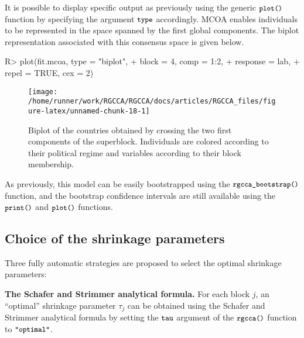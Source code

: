 \documentclass[
]{jss}
\begin{document}
\normalsize

It is possible to display specific output as previously using the
generic \(\small{\texttt{plot()}}\) function by specifying the argument
\(\small{\texttt{type}}\) accordingly. MCOA enables individuals to be
represented in the space spanned by the first global components. The
biplot representation associated with this consensus space is given
below.

\footnotesize

\begin{CodeChunk}
\begin{CodeInput}
R> plot(fit.mcoa, type = "biplot", 
+      block = 4, comp = 1:2, 
+      response = lab, 
+      repel = TRUE, cex = 2)
\end{CodeInput}
\begin{figure}[H]

{\centering \texttt{[image: /home/runner/work/RGCCA/RGCCA/docs/articles/RGCCA\_files/figure-latex/unnamed-chunk-18-1]} 

}

\caption[Biplot of the countries obtained by crossing the two first components of the superblock]{Biplot of the countries obtained by crossing the two first components of the superblock. Individuals are colored according to their political regime and variables according to their block membership.}\label{fig:unnamed-chunk-18}
\end{figure}
\end{CodeChunk}

\normalsize

As previously, this model can be easily bootstrapped using the
\(\small{\texttt{rgcca\_bootstrap()}}\) function, and the bootstrap
confidence intervals are still available using the
\(\small{\texttt{print()}}\) and \(\small{\texttt{plot()}}\) functions.

\hypertarget{choice-of-the-shrinkage-parameters}{%
\subsection{Choice of the shrinkage
parameters}\label{choice-of-the-shrinkage-parameters}}

Three fully automatic strategies are proposed to select the optimal
shrinkage parameters:

\textbf{The Schafer and Strimmer analytical formula.} For each block
\(j\), an ``optimal'' shrinkage parameter \(\tau_j\) can be obtained
using the Schafer and Strimmer analytical formula \citep{Schafer2005} by
setting the \(\small{\texttt{tau}}\) argument of the
\(\small{\texttt{rgcca()}}\) function to \(\small{\texttt{"optimal"}}\).
\end{document}
